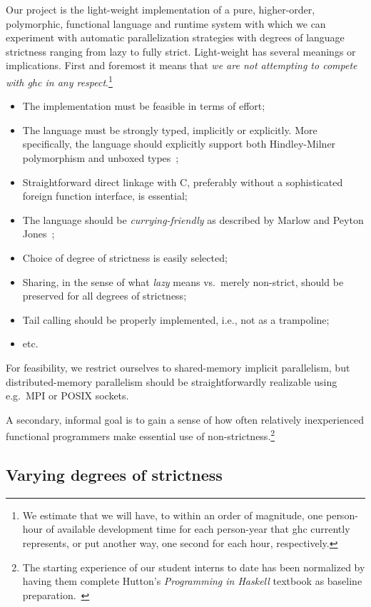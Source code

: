 \documentclass{llncs}
\begin{document}
Our project is the light-weight implementation of a pure, higher-order,
polymorphic, functional language and runtime system with which we can
experiment with automatic parallelization strategies with degrees of language
strictness ranging from lazy to fully strict.  Light-weight has several
meanings or implications.  First and foremost it means that \emph{we are not
  attempting to compete with ghc in any respect}.\footnote{We estimate that we
  will have, to within an order of magnitude, one person-hour of available
  development time for each person-year that ghc currently represents, or put
  another way, one second for each hour, respectively.}

\begin{itemize}
\item The implementation must be feasible in terms of effort;
\item The language must be strongly typed, implicitly or explicitly.  More
  specifically, the language should explicitly support both Hindley-Milner
  polymorphism and unboxed types~\cite{Jones:1991};
\item Straightforward direct linkage with C, preferably without a sophisticated
  foreign function interface, is essential;
  \item The language should be \emph{currying-friendly} as described by Marlow
and Peyton Jones~\cite{Marlow2004};
\item Choice of degree of strictness is easily selected;
\item Sharing, in the sense of what \emph{lazy} means vs.\ merely non-strict,
  should be preserved for all degrees of strictness;
\item Tail calling should be properly implemented, i.e., not as a trampoline;
\item etc.
\end{itemize}

For feasibility, we restrict ourselves to shared-memory implicit parallelism,
but distributed-memory parallelism should be straightforwardly realizable
using e.g.\ MPI or POSIX sockets.

A secondary, informal goal is to gain a sense of how often relatively
inexperienced functional programmers make essential use of
non-strictness.\footnote{The starting experience of our student interns to
  date has been normalized by having them complete Hutton's \emph{Programming in Haskell} textbook
as baseline preparation.~\cite{Hutton-book}}

\subsection{Varying degrees of strictness}
\end{document}
